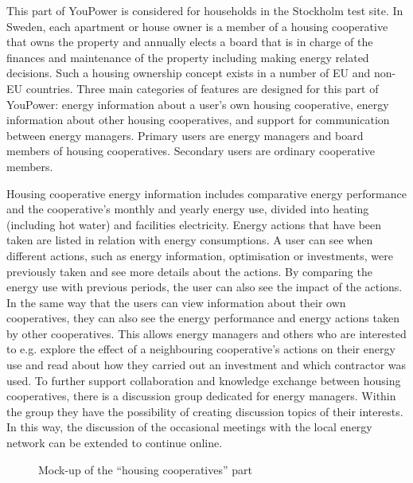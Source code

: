 This part of YouPower is considered for households in the Stockholm test site. In Sweden, each apartment or house owner is a member of a housing cooperative that owns the property and annually elects a board that is in charge of the finances and maintenance of the property including making energy related decisions. 
Such a housing ownership concept exists in a number of EU and non-EU countries.
% 
Three main categories of features are designed for this part of YouPower: energy information about a user's own housing cooperative, energy information about other housing cooperatives, and support for communication between energy managers.
Primary users are energy managers and board members of housing cooperatives. Secondary users are ordinary cooperative members. 

Housing cooperative energy information includes comparative energy performance %
and the cooperative's monthly and yearly energy use, divided into heating (including hot water) and facilities electricity. Energy actions that have been taken are listed in relation with energy consumptions. 
A user can see when different actions, such as energy information, optimisation or investments, were previously taken and see more details about the actions. By comparing the energy use with previous periods, the user can also see the impact of the actions.
% 
In the same way that the users can view information about their own cooperatives, they can also see the energy performance and energy actions taken by other cooperatives. This allows energy managers and others who are interested to e.g. explore the effect of a neighbouring cooperative's actions on their energy use and read about how they carried out an investment and which contractor was used. 
% 
To further support collaboration and knowledge exchange between housing cooperatives, there is a discussion group dedicated for energy managers. Within the group they have the possibility of creating discussion topics of their interests. In this way, the discussion of the occasional meetings with the local energy network can be extended to continue online.

\begin{figure}
\centering
\caption{Mock-up of the ``housing cooperatives'' part}
\label{fig:brf}
\end{figure}

